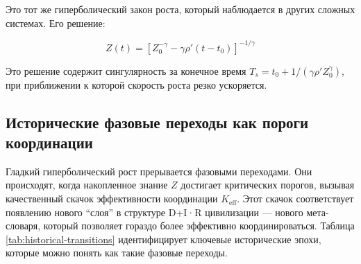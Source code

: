 \documentclass[12pt,a4paper]{article}
\theoremstyle{remark}
\begin{document}
	Это тот же гиперболический закон роста, который наблюдается в других сложных системах. Его решение:
	
	\begin{equation}
		Z(t) = \left[ Z_0^{-\gamma} - \gamma \rho' (t - t_0) \right]^{-1/\gamma}
		\label{eq:Z-hyperbolic}
	\end{equation}
	
	Это решение содержит сингулярность за конечное время $T_s = t_0 + 1/(\gamma \rho' Z_0^{\gamma})$, при приближении к которой скорость роста резко ускоряется.
	
	\subsection{Исторические фазовые переходы как пороги координации}
	
	Гладкий гиперболический рост прерывается фазовыми переходами. Они происходят, когда накопленное знание $Z$ достигает критических порогов, вызывая качественный скачок эффективности координации $K_{\text{eff}}$. Этот скачок соответствует появлению нового ``слоя'' в структуре D+I·R цивилизации — нового мета-словаря, который позволяет гораздо более эффективно координироваться. Таблица \ref{tab:historical-transitions} идентифицирует ключевые исторические эпохи, которые можно понять как такие фазовые переходы.
	
\end{document}
